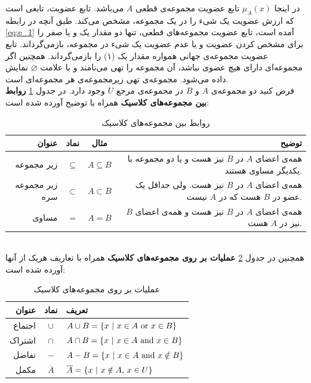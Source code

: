 \documentclass[12pt,a4paper]{article}
\theoremstyle{definition}
\begin{document}
در اینجا
$\mu_{A}(x)$
 تابع عضویت مجموعه‌ی قطعی $A$ می‌باشد. تابع عضویت، تابعی است که ارزش عضویت یک شیء را در یک مجموعه، مشخص می‌کند. طبق آنچه در رابطه
 \ref{eq:e_1}
 آمده است، تابع عضویت مجموعه‌های قطعی، تنها دو مقدار یک و یا صفر را برای مشخص کردن عضویت و یا عدم عضویت یک شیء در مجموعه، بازمی‌گرداند. تابع عضویت مجموعه‌ی جهانی همواره مقدار یک (۱) را بازمی‌گرداند. همچنین اگر مجموعه‌ای دارای هیچ عضوی نباشد، آن مجموعه‌ را تهی
 می‌نامند و با علامت $\varnothing$ نمایش داده می‌شود. مجموعه‌ی تهی زیرمجموعه‌ی هر مجموعه‌ای است.
 \cite{Lee2005}
 \\
فرض کنید دو مجموعه‌ی $ A $ و $ B  $ در مجموعه‌ی مرجع $ U $ وجود دارد.  در جدول   
\ref{table:t_1}
\textbf{روابط بین مجموعه‌های کلاسیک} 
 همراه با توضیح آورده شده است:
\begin{table}[!htbp]
\begin{center}
	{\footnotesize
 \begin{tabular}{r c c r} \hline
عنوان & نماد &  مثال & توضیح  
\\\hline 
زیر مجموعه  &
$\subseteq$ &
$A \subseteq B$ &
همه‌ی اعضای $A$ در $B$ نیز هست و یا دو مجموعه با یکدیگر مساوی هستند.
\\
زیر مجموعه سره &
$\subset$ &
 $A \subset B$ &
همه‌ی اعضای $A$ در $B$ نیز هست. ولی حداقل یک عضو در $B$ هست که در $A$ نیست.
\\
مساوی &
$=$ &
$A = B$ &
همه‌ی اعضای $A$ در $B$ نیز هست و همه‌ی اعضای $B$ نیز در $A$ هست.
\\\hline
 \end{tabular}
 \caption{روابط بین مجموعه‌های کلاسیک}
 \label{table:t_1}
}
\end{center}
\end{table}
\\
همچنین در جدول
\ref{table:t_2}
\textbf{عملیات بر روی مجموعه‌های کلاسیک} 
همراه با تعاریف هریک از آنها آورده شده‌ است:
\begin{table}[!htbp]
	{\footnotesize
	\begin{center}
		\begin{tabular}{r c l} \hline
			عنوان & نماد & تعریف  
			\\\hline 
			اجتماع   &
			$\cup$ &
			$A \cup B = \{x\ |\ x \in A\ {\rm or}\ x \in B \}$ 
			\\
			اشتراک   &
			$\cap$ &
			$A \cap B = \{x\ |\ x \in A\ {\rm and}\ x \in B \}$ 
			\\
			تفاضل &
			$-$ &
			$A - B = \{x\ |\ x \in A\ {\rm and}\ x \notin B \}$ 
		   \\
			مکمل &
			$\overline{A}$ &
			$\overline{A} = \{x\ |\ x \notin A{\rm ,}\ x \in U \}$ 
			\\\hline 
		\end{tabular}
		\caption{عملیات بر روی مجموعه‌های کلاسیک}
		\label{table:t_2}
\end{center}
	}
\end{table} 
\end{document}
